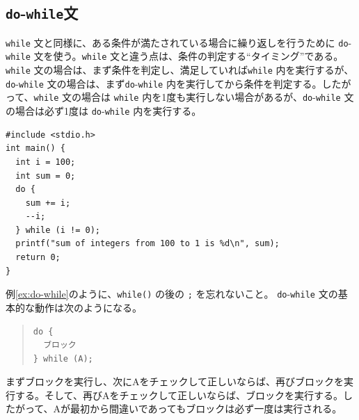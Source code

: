 \subsection{{\tt do}-{\tt while}文}
\verb|while| 文と同様に、ある条件が満たされている場合に繰り返しを行うために \verb|do|-\verb|while| 文を使う。\verb|while| 文と違う点は、条件の判定する``タイミング''である。\verb|while| 文の場合は、まず条件を判定し、満足していれば\verb|while| 内を実行するが、\verb|do|-\verb|while| 文の場合は、まず\verb|do|-\verb|while| 内を実行してから条件を判定する。したがって、\verb|while| 文の場合は \verb|while| 内を1度も実行しない場合があるが、\verb|do|-\verb|while| 文の場合は必ず1度は \verb|do|-\verb|while| 内を実行する。
%
\begin{reidai}\label{ex:do-while}
\begin{verbatim}
#include <stdio.h>
int main() {
  int i = 100;
  int sum = 0;
  do {
    sum += i;
    --i;
  } while (i != 0);
  printf("sum of integers from 100 to 1 is %d\n", sum);
  return 0;
}
\end{verbatim}
\end{reidai} \noindent
%
例\ref{ex:do-while}のように、\verb|while()| の後の \verb|;| を忘れないこと。
\verb|do|-\verb|while| 文の基本的な動作は次のようになる。
%
\begin{quote}
\begin{verbatim}
do {
  ブロック
} while (A);
\end{verbatim}
\end{quote}
%
まずブロックを実行し、次にAをチェックして正しいならば、再びブロックを実行する。そして、再びAをチェックして正しいならば、ブロックを実行する。したがって、Aが最初から間違いであってもブロックは必ず一度は実行される。

